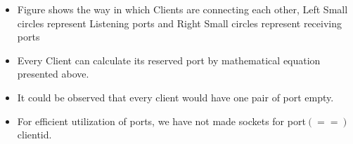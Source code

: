 \documentclass[12pt]{scrartcl}
\begin{document}
\begin{center}
\begin{tikzpicture}
        
        
        
    \end{tikzpicture}
    \end{center}
\begin{itemize}
    \item Figure shows the way in which Clients are connecting each other, Left Small circles represent Listening ports and Right Small circles represent receiving ports
    \item Every Client can calculate its reserved port by mathematical equation presented above. 
    \item It could be observed that every client would have one pair of port empty.
    \item For efficient utilization of ports, we have not made sockets for port$(==)$clientid.
\end{itemize}
\end{document}
